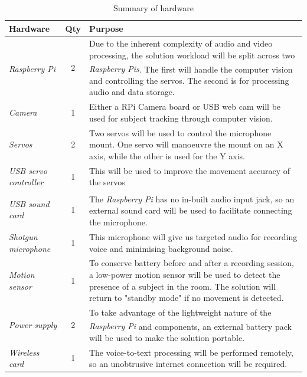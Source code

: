 \documentclass[11pt,a4paper,titlepage]{report}
\newcommand{\rpi}{\textit{Raspberry Pi\textsuperscript{\textregistered}}}
\newcommand{\rpis}{\textit{Raspberry Pi\textsuperscript{\textregistered}s}}
\begin{document}
\begin{center}
\begin{table}
{\tabulinesep=2mm
\begin{tabu}{ lcp{7cm} }

    \textbf{Hardware} & \textbf{Qty} & \textbf{Purpose} \\ \hline
    
    \rpi & 2 & Due to the inherent complexity of audio and video processing, the solution workload will be split across two \rpis. The first will handle the computer vision and controlling the servos. The second is for processing audio and data storage.\\ 

    \textit{Camera} & 1 & Either a RPi Camera board or USB web cam will be used for subject tracking through computer vision. \\ 
    
   \textit{Servos} & 2 & Two servos will be used to control the microphone mount. One servo will manoeuvre the mount on an X axis, while the other is used for the Y axis. \\ 
        
    \textit{USB servo controller} & 1 & This will be used to improve the movement accuracy of the servos \\ 
    
    \textit{USB sound card} & 1 & The \rpi\xspace has no in-built audio input jack, so an external sound card will be used to facilitate connecting the microphone. \\ 
    
    \textit{Shotgun microphone} & 1 & This microphone will give us targeted audio for recording voice and minimising background noise. \\ 
    
    \textit{Motion sensor} & 1 & To conserve battery before and after a recording session, a low-power motion sensor will be used to detect the presence of a subject in the room. The solution will return to "standby mode" if no movement is detected.\\ 

    \textit{Power supply} & 2 & To take advantage of the lightweight nature of the \rpi\xspace and components, an external battery pack will be used to make the solution portable.\\ 


    \textit{Wireless card} & 1 & The voice-to-text processing will be performed remotely, so an unobtrusive internet connection will be required.\\ \hline
    
\end{tabu} }
\caption{Summary of hardware}
\label{table:hardwaretable}
\end{table}

\end{center}
\end{document}
